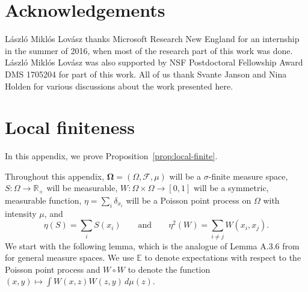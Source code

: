 \documentclass{amsart}
\numberwithin{equation}{section}
\numberwithin{figure}{section}
\theoremstyle{definition}
\theoremstyle{remark}
\newcommand{\bOmega}{{\mathbf{\Omega}}}
\newcommand{\EE}{\mathbb{E}}
\newcommand{\RR}{\mathbb{R}}
\newcommand{\cF}{\mathcal{F}}
\begin{document}
\section*{Acknowledgements}

L\'aszl\'o Mikl\'os Lov\'asz thanks Microsoft Research New England for an
internship in the summer of 2016, when most of the research part of this work
was done. L\'aszl\'o Mikl\'os Lov\'asz was also supported by NSF Postdoctoral Fellowship Award DMS 1705204 for part of this work. All of us thank Svante Janson and Nina Holden for various
discussions about the work presented here.

\appendix

\section{Local finiteness}\label{app:local-finite}
In this appendix, we prove Proposition~\ref{prop:local-finite}.

Throughout this appendix, $\bOmega=(\Omega,\cF,\mu)$ will be a
$\sigma$-finite measure space, $S\colon\Omega\to\RR_+$ will be measurable,
$W\colon\Omega\times\Omega\to [0,1]$ will be a symmetric, measurable
function, $\eta=\sum_{i}\delta_{x_i}$ will be a Poisson point process on
$\Omega$ with intensity $\mu$, and
\[
\eta(S)=\sum_i S(x_i)
\qquad\text{and}\qquad
\eta^2(W)=\sum_{i\neq j} W(x_i,x_j).
\]
We start with the following lemma, which is the analogue of Lemma A.3.6 from
\cite{Kal05} for general measure spaces. We use $\EE$ to denote expectations
with respect to the Poisson point process and $W\circ W$ to denote the
function $(x,y)\mapsto\int W(x,z)W(z,y)\,d\mu(z)$.
\end{document}
